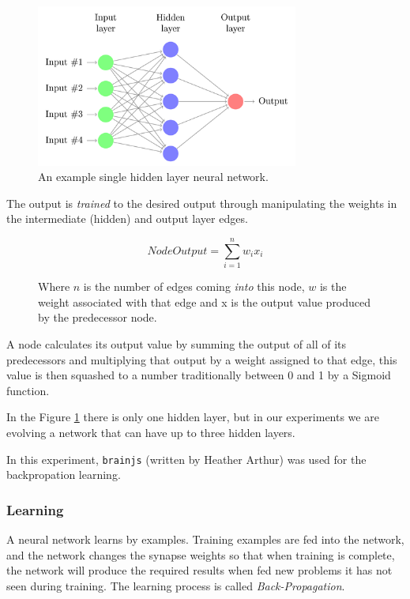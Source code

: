 \documentclass[journal]{IEEEtran}
\begin{document}
\begin{figure}[here]%
  \centering
  \includegraphics[width=3.4in]{neural-network}
  \caption{An example single hidden layer neural network.}
  \label{fig:NeuralNetwork}
\end{figure}

The output is \textit{trained} to the desired output through manipulating the weights in the
intermediate (hidden) and output layer edges.

\begin{figure}[here]
  \[  NodeOutput = \sum_{i=1}^{n} w_{i} x_{i} \]
  \caption{Where $n$ is the number of edges coming \textit{into} this node, $w$ is the weight
  associated with that edge and x is the output value produced by the predecessor node.}
  \label{fig:NodeOutput}
\end{figure}

A node calculates its output value by summing the output of all of its predecessors and multiplying
that output by a weight assigned to that edge, this value is then squashed to a number traditionally
between 0 and 1 by a Sigmoid function.

In the Figure \ref{fig:NeuralNetwork} there is only one hidden layer, but in our experiments we
are evolving a network that can have up to three hidden layers.

In this experiment, \texttt{brainjs} (written by Heather Arthur) was used for the backpropation learning.\cite{brain}

\subsubsection*{Learning}
A neural network learns by examples. Training examples are fed into the network, and the network changes
the synapse weights so that when training is complete, the network will produce the required results when
fed new problems it has not seen during training. The learning process is called \textit{Back-Propagation}.\cite{slides}
\end{document}
